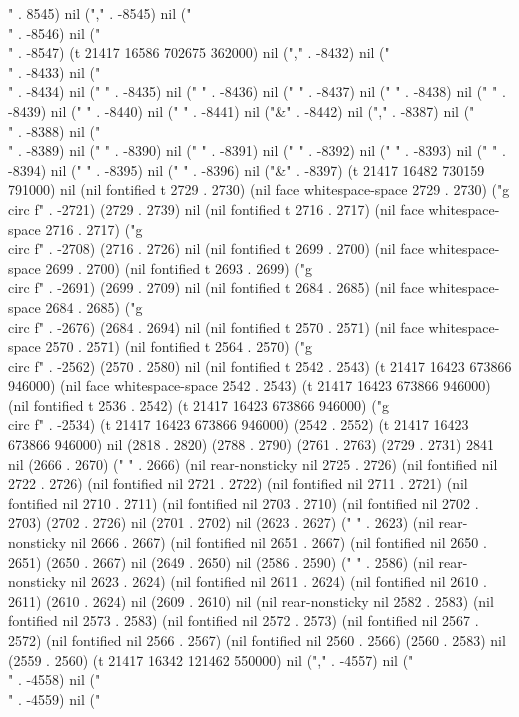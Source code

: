 " . 8545) nil ("," . -8545) nil ("\\" . -8546) nil ("\\" . -8547) (t 21417 16586 702675 362000) nil ("," . -8432) nil ("\\" . -8433) nil ("\\" . -8434) nil ("
" . -8435) nil (" " . -8436) nil (" " . -8437) nil (" " . -8438) nil (" " . -8439) nil (" " . -8440) nil (" " . -8441) nil ("&" . -8442) nil ("," . -8387) nil ("\\" . -8388) nil ("\\" . -8389) nil ("
" . -8390) nil (" " . -8391) nil (" " . -8392) nil (" " . -8393) nil (" " . -8394) nil (" " . -8395) nil (" " . -8396) nil ("&" . -8397) (t 21417 16482 730159 791000) nil (nil fontified t 2729 . 2730) (nil face whitespace-space 2729 . 2730) ("g\\circ f" . -2721) (2729 . 2739) nil (nil fontified t 2716 . 2717) (nil face whitespace-space 2716 . 2717) ("g\\circ f" . -2708) (2716 . 2726) nil (nil fontified t 2699 . 2700) (nil face whitespace-space 2699 . 2700) (nil fontified t 2693 . 2699) ("g\\circ f" . -2691) (2699 . 2709) nil (nil fontified t 2684 . 2685) (nil face whitespace-space 2684 . 2685) ("g\\circ f" . -2676) (2684 . 2694) nil (nil fontified t 2570 . 2571) (nil face whitespace-space 2570 . 2571) (nil fontified t 2564 . 2570) ("g\\circ f" . -2562) (2570 . 2580) nil (nil fontified t 2542 . 2543) (t 21417 16423 673866 946000) (nil face whitespace-space 2542 . 2543) (t 21417 16423 673866 946000) (nil fontified t 2536 . 2542) (t 21417 16423 673866 946000) ("g\\circ f" . -2534) (t 21417 16423 673866 946000) (2542 . 2552) (t 21417 16423 673866 946000) nil (2818 . 2820) (2788 . 2790) (2761 . 2763) (2729 . 2731) 2841 nil (2666 . 2670) ("        " . 2666) (nil rear-nonsticky nil 2725 . 2726) (nil fontified nil 2722 . 2726) (nil fontified nil 2721 . 2722) (nil fontified nil 2711 . 2721) (nil fontified nil 2710 . 2711) (nil fontified nil 2703 . 2710) (nil fontified nil 2702 . 2703) (2702 . 2726) nil (2701 . 2702) nil (2623 . 2627) ("        " . 2623) (nil rear-nonsticky nil 2666 . 2667) (nil fontified nil 2651 . 2667) (nil fontified nil 2650 . 2651) (2650 . 2667) nil (2649 . 2650) nil (2586 . 2590) ("        " . 2586) (nil rear-nonsticky nil 2623 . 2624) (nil fontified nil 2611 . 2624) (nil fontified nil 2610 . 2611) (2610 . 2624) nil (2609 . 2610) nil (nil rear-nonsticky nil 2582 . 2583) (nil fontified nil 2573 . 2583) (nil fontified nil 2572 . 2573) (nil fontified nil 2567 . 2572) (nil fontified nil 2566 . 2567) (nil fontified nil 2560 . 2566) (2560 . 2583) nil (2559 . 2560) (t 21417 16342 121462 550000) nil ("," . -4557) nil ("\\" . -4558) nil ("\\" . -4559) nil ("
